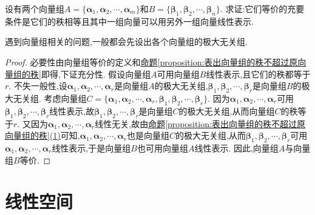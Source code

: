 \documentclass[lang=cn,newtx,10pt,scheme=chinese]{elegantbook}
\begin{document}
\begin{proposition}[向量组等价的充要条件]\label{proposition:向量组等价的充要条件}
设有两个向量组\(A = \{\boldsymbol{\alpha}_1,\boldsymbol{\alpha}_2,\cdots,\boldsymbol{\alpha}_m\}\)和\(B = \{\boldsymbol{\beta}_1,\boldsymbol{\beta}_2,\cdots,\boldsymbol{\beta}_n\}\). 求证:它们等价的充要条件是它们的秩相等且其中一组向量可以用另外一组向量线性表示.
\end{proposition}
\begin{note}
遇到向量组相关的问题,一般都会先设出各个向量组的极大无关组.
\end{note}
\begin{proof}
必要性由向量组等价的定义和\hyperref[proposition:表出向量组的秩不超过原向量组的秩]{命题\ref{proposition:表出向量组的秩不超过原向量组的秩}}即得,下证充分性. 假设向量组\(A\)可用向量组\(B\)线性表示,且它们的秩都等于\(r\). 不失一般性,设\(\boldsymbol{\alpha}_1,\boldsymbol{\alpha}_2,\cdots,\boldsymbol{\alpha}_r\)是向量组\(A\)的极大无关组,\(\boldsymbol{\beta}_1,\boldsymbol{\beta}_2,\cdots,\boldsymbol{\beta}_r\)是向量组\(B\)的极大无关组. 考虑向量组\(C = \{\boldsymbol{\alpha}_1,\boldsymbol{\alpha}_2,\cdots,\boldsymbol{\alpha}_r,\boldsymbol{\beta}_1,\boldsymbol{\beta}_2,\cdots,\boldsymbol{\beta}_r\}\). 因为\(\boldsymbol{\alpha}_1,\boldsymbol{\alpha}_2,\cdots,\boldsymbol{\alpha}_r\)可用\(\boldsymbol{\beta}_1,\boldsymbol{\beta}_2,\cdots,\boldsymbol{\beta}_r\)线性表示,故\(\boldsymbol{\beta}_1,\boldsymbol{\beta}_2,\cdots,\boldsymbol{\beta}_r\)是向量组\(C\)的极大无关组,从而向量组\(C\)的秩等于\(r\). 又因为\(\boldsymbol{\alpha}_1,\boldsymbol{\alpha}_2,\cdots,\boldsymbol{\alpha}_r\)线性无关,故由\hyperref[proposition:表出向量组的秩不超过原向量组的秩]{命题\ref{proposition:表出向量组的秩不超过原向量组的秩}(1)}可知,\(\boldsymbol{\alpha}_1,\boldsymbol{\alpha}_2,\cdots,\boldsymbol{\alpha}_r\)也是向量组\(C\)的极大无关组,从而\(\boldsymbol{\beta}_1,\boldsymbol{\beta}_2,\cdots,\boldsymbol{\beta}_r\)可用\(\boldsymbol{\alpha}_1,\boldsymbol{\alpha}_2,\cdots,\boldsymbol{\alpha}_r\)线性表示,于是向量组\(B\)也可用向量组\(A\)线性表示. 因此,向量组\(A\)与向量组\(B\)等价. 
\end{proof}

\section{线性空间}
\end{document}
